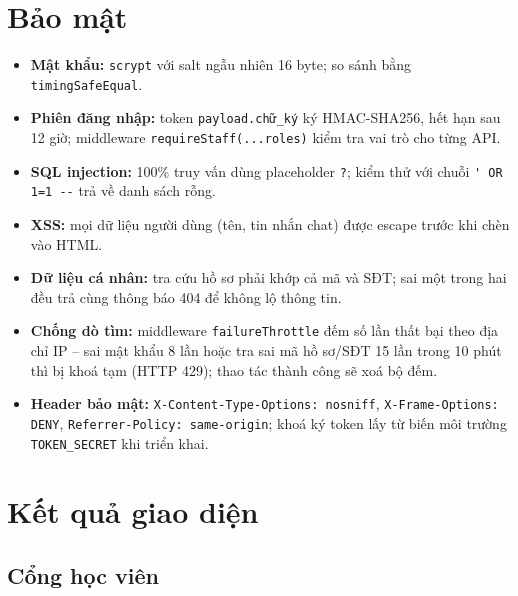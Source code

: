 \section{Bảo mật}
\begin{itemize}
  \item \textbf{Mật khẩu:} \texttt{scrypt} với salt ngẫu nhiên 16 byte; so sánh bằng \texttt{timingSafeEqual}.
  \item \textbf{Phiên đăng nhập:} token \texttt{payload.chữ\_ký} ký HMAC-SHA256, hết hạn sau 12 giờ; middleware \texttt{requireStaff(...roles)} kiểm tra vai trò cho từng API.
  \item \textbf{SQL injection:} 100\% truy vấn dùng placeholder \texttt{?}; kiểm thử với chuỗi \verb|' OR 1=1 --| trả về danh sách rỗng.
  \item \textbf{XSS:} mọi dữ liệu người dùng (tên, tin nhắn chat) được escape trước khi chèn vào HTML.
  \item \textbf{Dữ liệu cá nhân:} tra cứu hồ sơ phải khớp cả mã và SĐT; sai một trong hai đều trả cùng thông báo 404 để không lộ thông tin.
  \item \textbf{Chống dò tìm:} middleware \texttt{failureThrottle} đếm số lần thất bại theo địa chỉ IP – sai mật khẩu 8 lần hoặc tra sai mã hồ sơ/SĐT 15 lần trong 10 phút thì bị khoá tạm (HTTP 429); thao tác thành công sẽ xoá bộ đếm.
  \item \textbf{Header bảo mật:} \texttt{X-Content-Type-Options: nosniff}, \texttt{X-Frame-Options: DENY}, \texttt{Referrer-Policy: same-origin}; khoá ký token lấy từ biến môi trường \texttt{TOKEN\_SECRET} khi triển khai.
\end{itemize}

\section{Kết quả giao diện}
\subsection{Cổng học viên}

